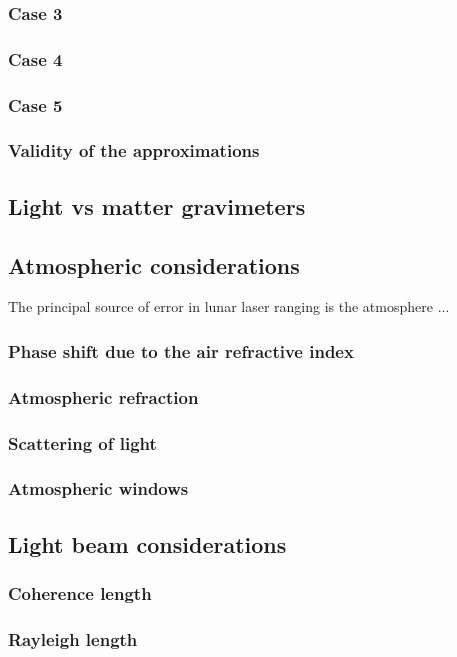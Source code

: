 \documentclass{article}
\begin{document}
\subsubsection{Case 3}
\subsubsection{Case 4}
\subsubsection{Case 5}

\subsubsection{Validity of the approximations}

\subsection{Light vs matter gravimeters}

\subsection{Atmospheric considerations}
The principal source of error in lunar laser ranging is the atmosphere \cite{mingyue2022_DLLR} ...

\subsubsection{Phase shift due to the air refractive index}
\subsubsection{Atmospheric refraction}
\subsubsection{Scattering of light}
\subsubsection{Atmospheric windows}

\subsection{Light beam considerations}
\subsubsection{Coherence length}
\subsubsection{Rayleigh length}




\end{document}
